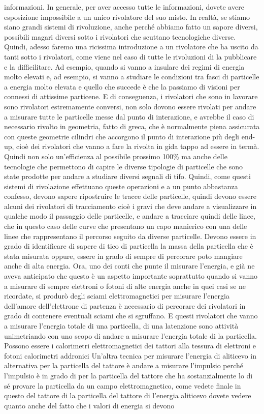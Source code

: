 informazioni. In generale, per aver accesso tutte le informazioni, dovete avere esposizione impossibile a un unico rivolatore del suo misto. In realtà, se stiamo siano grandi sistemi di rivoluzione, anche perché abbiamo fatto un sapore diversi, possibili magari diversi sotto i rivolatori che scuttano tecnologiche diverse. Quindi, adesso faremo una ricissima introduzione a un rivolatore che ha uscito da tanti sotto i rivolatori, come viene nel caso di tutte le rivoluzioni di la pubblicare e la difficilitare. Ad esempio, quando si vanno a insulare dei regimi di energia molto elevati e, ad esempio, si vanno a studiare le condizioni tra fasci di particelle a energia molto elevata e quello che succede è che la passiamo di visioni per connessi di attissime particene. E di conseguenza, i rivolatori che sono in lavorare sono rivolatori estremamente conversi, non solo dovono essere rivolati per andare a misurare tutte le particelle messe dal punto di interazione, e avrebbe il caso di necessario rivolto in geometria, fatto di greca, che è normalmente piena assicurata con queste geometrie cilindri che accorgono il punto di interazione più degli end-up, cioè dei rivolatori che vanno a fare la rivolta in gida tappo ad essere in termà. Quindi non solo un'efficienza al possibile prossimo 100\% ma anche delle tecnologie che permettono di capire le diverse tipologie di particelle che sono state prodotte per andare a studiare diversi segnali di tifo. Quindi, come questi sistemi di rivolazione effettuano queste operazioni e a un punto abbastanza confesso, devono sapere ripostruire le tracce delle particelle, quindi devono essere alcuni dei rivolatori di tracciamento cioè i gravi che deve andare a visualizzare in qualche modo il passaggio delle particelle, e andare a tracciare quindi delle linee, che in questo caso delle curve che presentano un capo manierico con una delle linee che rappresentano il percorso seguito da diverse particelle. Devono essere in grado di identificare di sapere di tico di particella la massa della particella che è stata misurata oppure, essere in grado di sempre di percorare poto mangiare anche di alta energia. Ora, uno dei conti che punte il misurare l'energia, e già ne aveva anticipato che questo è un aspetto importante soprattutto quando si vanno a misurare di sempre elettroni o fotoni di alte energia anche in quei casi se ne ricordate, si produrò degli sciami elettromagnetici per misurare l'energia dell'amore dell'elettrone di partenza è necessario di percorare dei rivolatori in grado di contenere eventuali sciami che si sgruffano. E questi rivolatori che vanno a misurare l'energia totale di una particella, di una latenzione sono attività unimetriando con uno scopo di andare a misurare l'energia totale di la particella. Possono essere i calorimetri elettromagnetici dei tattori alla tessura di elettroni e fotoni calorimetri addronici Un'altra tecnica per misurare l'energia di aliticevo in alternativa per la particella del tattore è andare a misurare l'impulsio perché l'impulsio è in grado di per la particella del tattore che ha sostanzialmente lo di sé provare la particella da un campo elettromagnetico, come vedete finale in questo del tattore di la particella del tattore di l'energia aliticevo dovete vedere quanto anche del fatto che i valori di energia si devono 